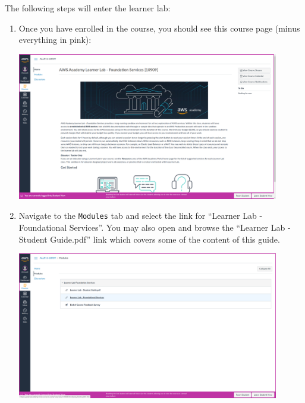 \documentclass{csse4400}
\begin{document}
The following steps will enter the learner lab:

\begin{enumerate}

\item Once you have enrolled in the course, you should see this course page (minus everything in pink):

\includegraphics[width=0.9\textwidth]{images/academy-homepage}

\item Navigate to the \texttt{Modules} tab and select the link for ``Learner Lab - Foundational Services''.
      You may also open and browse the ``Learner Lab - Student Guide.pdf'' link which covers some of the content of this guide.

\includegraphics[width=0.9\textwidth]{images/modules-page}


\end{enumerate}
\end{document}
